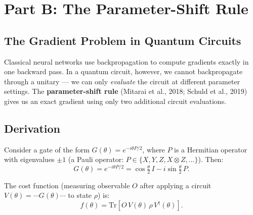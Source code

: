 \documentclass[a4paper,11pt]{article}
\begin{document}
\section{Part B: The Parameter-Shift Rule}

\subsection{The Gradient Problem in Quantum Circuits}

Classical neural networks use backpropagation to compute gradients exactly
in one backward pass. In a quantum circuit, however, we cannot backpropagate
through a unitary — we can only \emph{evaluate} the circuit at different
parameter settings. The \textbf{parameter-shift rule} (Mitarai et al., 2018;
Schuld et al., 2019) gives us an exact gradient using only two additional
circuit evaluations.

\subsection{Derivation}

Consider a gate of the form $G(\theta) = e^{-i\theta P/2}$, where $P$ is a
Hermitian operator with eigenvalues $\pm 1$ (a Pauli operator: $P \in
\{X, Y, Z, X\otimes Z, \ldots\}$). Then:
\begin{equation}
    G(\theta) = e^{-i\theta P/2} = \cos\!\tfrac{\theta}{2}\,I
    - i\sin\!\tfrac{\theta}{2}\,P.
\end{equation}

The cost function (measuring observable $O$ after applying a circuit
$V(\theta) = \cdots G(\theta) \cdots$ to state $\rho$) is:
\begin{equation}
    f(\theta) = \mathrm{Tr}\!\left[O\,V(\theta)\,\rho\,V^\dagger(\theta)\right].
\end{equation}
\end{document}
